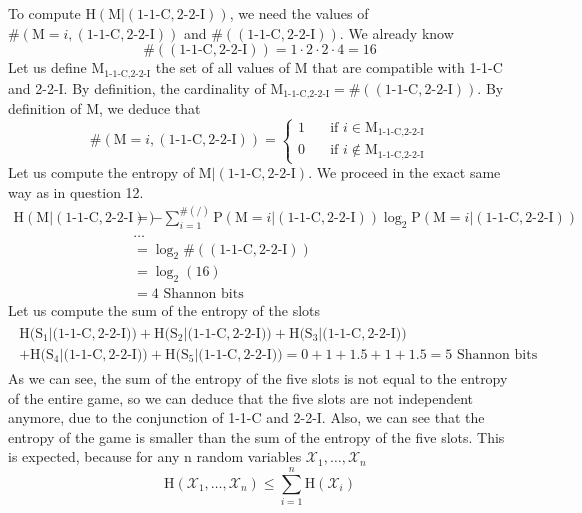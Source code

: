 \documentclass{article}
\begin{document}
To compute $\mbox{H}(\mbox{M}|(\mbox{1-1-C}, \mbox{2-2-I}))$, we need the values of $\#(\mbox{M}=i, (\mbox{1-1-C}, \mbox{2-2-I}))$ and $\#((\mbox{1-1-C}, \mbox{2-2-I}))$. We already know 
$$
\#((\mbox{1-1-C}, \mbox{2-2-I})) = 1\cdot2\cdot2\cdot4  = 16
$$
Let us define $\mbox{M}_{\mbox{1-1-C},\mbox{2-2-I}}$ the set of all values of M that are compatible with 1-1-C and 2-2-I. By definition, the cardinality of $\mbox{M}_{\mbox{1-1-C},\mbox{2-2-I}} = \#((\mbox{1-1-C}, \mbox{2-2-I}))$. By definition of M, we deduce that
$$
\#(\mbox{M}=i, (\mbox{1-1-C},\mbox{2-2-I}))=
\begin{cases}
       1 &\quad\text{if } i \in \mbox{M}_{\mbox{1-1-C},\mbox{2-2-I}} \\
       0 &\quad\text{if } i \not\in \mbox{M}_{\mbox{1-1-C},\mbox{2-2-I}}
     \end{cases}
$$
Let us compute the entropy of $\mbox{M}|(\mbox{1-1-C},\mbox{2-2-I})$. We proceed in the exact same way as in question 12.
\begin{align*}
    \mbox{H}(\mbox{M}|(\mbox{1-1-C},\mbox{2-2-I})) &= -\sum_{i=1}^{\#(/)} \mbox{P}(\mbox{M}=i|(\mbox{1-1-C},\mbox{2-2-I}))\log_2\mbox{P}(\mbox{M}=i|(\mbox{1-1-C},\mbox{2-2-I}))\\
    &\dots\\
    &=\log_2\#((\mbox{1-1-C},\mbox{2-2-I}))\\
    &=\log_2(16)\\
    &=4 \mbox{ Shannon bits}
\end{align*}
Let us compute the sum of the entropy of the slots
\begin{align*}
\begin{multlined}
    \mbox{H}(\mbox{S}_1|(\mbox{1-1-C},\mbox{2-2-I))} + \mbox{H}(\mbox{S}_2|(\mbox{1-1-C},\mbox{2-2-I))}+\mbox{H}(\mbox{S}_3|(\mbox{1-1-C},\mbox{2-2-I))}\\+\mbox{H}(\mbox{S}_4|(\mbox{1-1-C},\mbox{2-2-I))}+\mbox{H}(\mbox{S}_5|(\mbox{1-1-C},\mbox{2-2-I))} = 0 + 1 + 1.5 + 1 + 1.5 = 5 \mbox{ Shannon bits}
\end{multlined}
\end{align*}
As we can see, the sum of the entropy of the five slots is not equal to the entropy of the entire game, so we can deduce that the five slots are not independent anymore, due to the conjunction of 1-1-C and 2-2-I. Also, we can see that the entropy of the game is smaller than the sum of the entropy of the five slots. This is expected, because for any n random variables $\mathcal{X}_1,\dots,\mathcal{X}_n$
$$
\mbox{H}(\mathcal{X}_1,\dots,\mathcal{X}_n) \leq \sum_{i=1}^n \mbox{H}(\mathcal{X}_i)
$$
\end{document}
